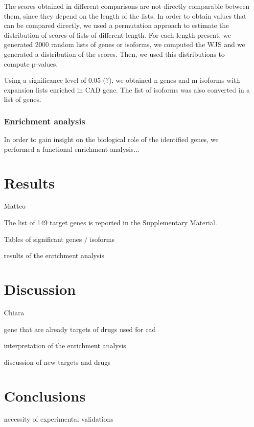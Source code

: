\documentclass[fleqn,10pt]{SelfArx} %
\begin{document}
The scores obtained in different comparisons are not directly comparable between them, since they depend on the length of the lists. In order to obtain values that can be compared directly, we used a permutation approach to estimate the distribution of scores of lists of different length. For each length present, we generated 2000 random lists of genes or isoforms, we computed the WJS and we generated a distribution of the scores. Then, we used this distributions to compute p-values.

Using a significance level of 0.05 (?), we obtained n genes and m isoforms with expansion lists enriched in CAD gene. The list of isoforms was also converted in a list of genes.

\subsubsection{Enrichment analysis}

In order to gain insight on the biological role of the identified genes, we performed a functional enrichment analysis...


\section*{Results}

Matteo

The list of 149 target genes is reported in the Supplementary Material.

Tables of significant genes / isoforms 

results of the enrichment analysis

\section*{Discussion}

Chiara

gene that are already targets of drugs used for cad

interpretation of the enrichment analysis

discussion of new targets and drugs

\section*{Conclusions}

necessity of experimental validations
\end{document}
